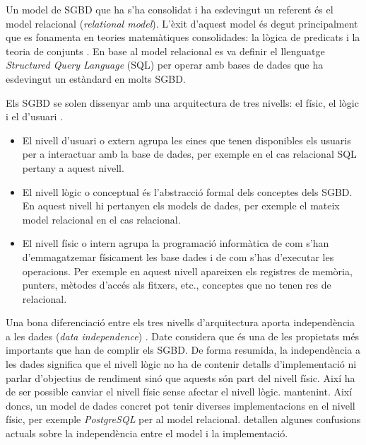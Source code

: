 Un model de SGBD que ha s'ha consolidat i ha esdevingut un referent és
el model relacional (\emph{relational model}). L'èxit d'aquest model
és degut principalment que es fonamenta en teories matemàtiques
consolidades: la lògica de predicats i la teoria de
conjunts \parencite{date:introduction}. En base al model relacional es
va definir el llenguatge \emph{Structured Query Language} (SQL) per
operar amb bases de dades que ha esdevingut un estàndard en molts
SGBD.


Els SGBD se solen dissenyar amb una arquitectura de tres nivells: el
físic, el lògic i el d'usuari \parencite{date:introduction}. 
\begin{itemize}

\item El nivell d'usuari o extern agrupa les eines que tenen
  disponibles els usuaris per a interactuar amb la base de dades, per
  exemple en el cas relacional SQL pertany a aquest nivell.

\item El nivell lògic o conceptual és l'abstracció formal dels
  conceptes dels SGBD. En aquest nivell hi pertanyen els models de
  dades, per exemple el mateix model relacional en el cas relacional.

\item El nivell físic o intern agrupa la programació informàtica de
  com s'han d'emmagatzemar físicament les base dades i de com s'has
  d'executar les operacions. Per exemple en aquest nivell apareixen
  els registres de memòria, punters, mètodes d'accés als fitxers,
  etc., conceptes que no tenen res de relacional.
\end{itemize}


Una bona diferenciació entre els tres nivells d'arquitectura aporta
independència a les dades (\emph{data
  independence}) \parencite{date:dictionary}. Date considera que és
una de les propietats més importants que han de complir els SGBD. De
forma resumida, la independència a les dades significa que el nivell
lògic no ha de contenir detalls d'implementació ni parlar d'objectius
de rendiment sinó que aquests són part del nivell físic. Així ha de
ser possible canviar el nivell físic sense afectar el nivell lògic.
mantenint.  Així doncs, un model de dades concret pot tenir diverses
implementacions en el nivell físic, per exemple
\emph{PostgreSQL} \parencite{postgresql} per al model
relacional. \textcite{dbdebunk} detallen algunes confusions actuals
sobre la independència entre el model i la implementació.

